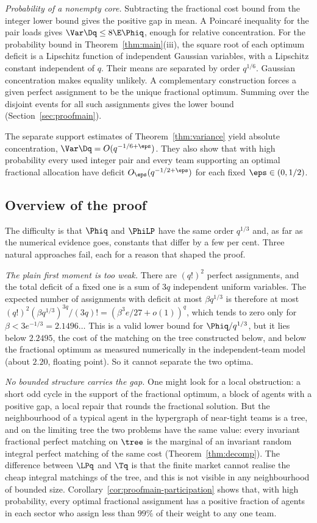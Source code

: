 \emph{Probability of a nonempty core.} Subtracting the fractional cost bound from the
integer lower bound gives the positive gap in mean. A Poincar\'e inequality for the
pair loads gives $\Var\Dq\le8\E\Phiq$, enough for relative concentration. For the
probability bound in Theorem~\ref{thm:main}(iii), the square root of each optimum
deficit is a Lipschitz function of independent Gaussian variables, with a Lipschitz
constant independent of $q$. Their means are separated by order $q^{1/6}$. Gaussian
concentration makes equality unlikely. A complementary construction forces a given
perfect assignment to be the unique fractional optimum. Summing over the disjoint events
for all such assignments gives the lower bound (Section~\ref{sec:proofmain}).

The separate support estimates of Theorem~\ref{thm:variance} yield absolute
concentration, $\Var\Dq=O(q^{-1/6+\eps})$. They also show that with high probability
every used integer pair and every team supporting an optimal fractional allocation
have deficit $O_\eps(q^{-1/2+\eps})$ for each fixed $\eps\in(0,1/2)$.

\subsection{Overview of the proof}\label{sec:intro-overview}

The difficulty is that $\Phiq$ and $\PhiLP$ have the same order $q^{1/3}$ and, as far as the
numerical evidence goes, constants that differ by a few per cent. Three natural approaches
fail, each for a reason that shaped the proof.

\emph{The plain first moment is too weak.} There are $(q!)^2$ perfect assignments, and the
total deficit of a fixed one is a sum of $3q$ independent uniform variables. The expected
number of assignments with deficit at most $\beta q^{1/3}$ is therefore at most
$(q!)^2(\beta q^{1/3})^{3q}/(3q)!=(\beta^3e/27+o(1))^q$, which tends to zero only for
$\beta<3e^{-1/3}=2.1496\ldots$ This is a valid lower bound for $\Phiq/q^{1/3}$, but it lies
below $2.2495$, the cost of the matching on the tree constructed below, and below the
fractional optimum as measured numerically in the independent-team model (about $2.20$,
floating point). So it cannot separate the two optima.

\emph{No bounded structure carries the gap.} One might look for a local obstruction: a short
odd cycle in the support of the fractional optimum, a block of agents with a positive gap, a
local repair that rounds the fractional solution. But the neighbourhood of a typical agent in
the hypergraph of near-tight teams is a tree, and on the limiting tree the two problems have
the same value: every invariant fractional perfect matching on $\tree$ is the marginal of an
invariant random integral perfect matching of the same cost (Theorem~\ref{thm:decomp}). The
difference between $\LPq$ and $\Tq$ is that the finite market cannot realise the cheap
integral matchings of the tree, and this is not visible in any neighbourhood of bounded size.
Corollary~\ref{cor:proofmain-participation} shows that, with high probability, every optimal
fractional assignment has a positive fraction of agents in each sector who assign less
than $99\%$ of their weight to any one team.

